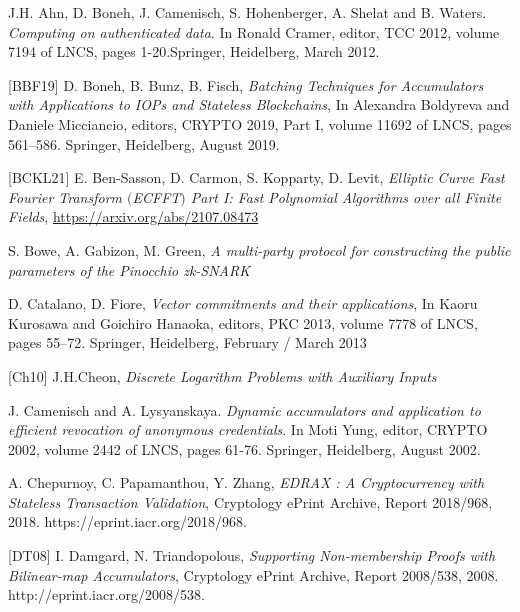 \documentclass[11pt, lettersize, notitlepage, leqno, footskip=0.6cm]{article}
\newcommand{\noin}{\noindent}
\numberwithin{equation}{section}
\begin{document}
\footnotesize

\noin [ABC+12] J.H. Ahn, D. Boneh, J. Camenisch, S. Hohenberger, A. Shelat and B. Waters. \textit{Computing on authenticated data}. In Ronald Cramer, editor, TCC 2012, volume 7194 of LNCS, pages 1-20.Springer, Heidelberg, March 2012. \vspace{1mm}

\noin \hypertarget{BBF}{[BBF19]} D. Boneh, B. Bunz, B. Fisch, \textit{Batching Techniques for Accumulators with Applications to IOPs and Stateless Blockchains}, In Alexandra Boldyreva and Daniele Micciancio, editors, CRYPTO 2019, Part I, volume 11692 of LNCS, pages 561–586. Springer, Heidelberg, August 2019.  \vspace{1mm}

\noin \hypertarget{noRoots}{[BCKL21]} E. Ben-Sasson, D. Carmon, S. Kopparty, D. Levit, \textit{Elliptic Curve Fast Fourier Transform $($ECFFT$)$ Part I: Fast Polynomial Algorithms over all Finite Fields}, \href{https://arxiv.org/abs/2107.08473}{https://arxiv.org/abs/2107.08473} \vspace{1mm}


\noin [BGG17] S. Bowe, A. Gabizon, M. Green, \textit{A multi-party protocol for constructing the public parameters of the Pinocchio zk-SNARK}\vspace{1mm}

\noin [CF13] D. Catalano, D. Fiore, \textit{Vector commitments and their applications}, In Kaoru Kurosawa and Goichiro Hanaoka, editors, PKC 2013, volume 7778 of LNCS, pages 55–72. Springer, Heidelberg, February / March 2013 \vspace{1mm}

\noin \hypertarget{Cheon}{[Ch10]} J.H.Cheon, \textit{Discrete Logarithm Problems with Auxiliary Inputs} \vspace{1mm}

\noin [CL02] J. Camenisch and A. Lysyanskaya. \textit{Dynamic accumulators and application to efficient revocation of anonymous credentials}. In Moti Yung, editor, CRYPTO 2002, volume 2442 of LNCS, pages 61-76. Springer, Heidelberg, August 2002. \vspace{1mm}

\noin [CPZ18] A. Chepurnoy, C. Papamanthou, Y. Zhang, \textit{EDRAX : A Cryptocurrency with Stateless Transaction Validation}, Cryptology ePrint Archive, Report 2018/968, 2018. https://eprint.iacr.org/2018/968.\vspace{1mm}

\noin \hypertarget{DT}{[DT08]} I. Damgard, N. Triandopolous, \textit{Supporting Non-membership Proofs with Bilinear-map Accumulators}, Cryptology ePrint Archive, Report 2008/538, 2008. http://eprint.iacr.org/2008/538.\vspace{1mm}
\end{document}
